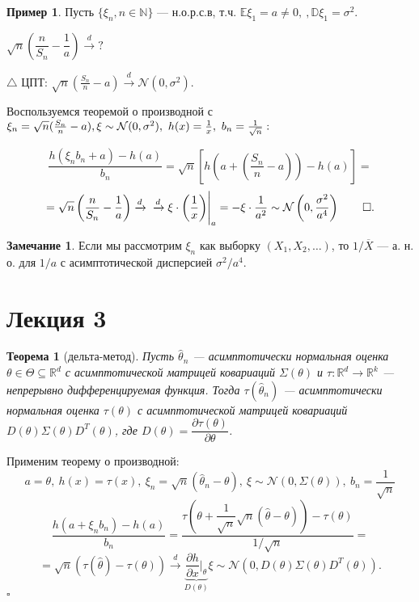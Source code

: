 \documentclass[12pt]{report}
\renewenvironment{proof}{{\bfseries Доказательство:}}{$\square$\\\\}
\newtheorem{theorem}{Теорема}
\theoremstyle{definition}
\newtheorem{example}{Пример}
\newtheorem{remark}{Замечание}
\begin{document}
\begin{example}
	Пусть $\{\xi_n, n \in \mathbb{N} \}$ — н.о.р.с.в, т.ч. $\mathbb{E}\xi_1 = a \neq 0, \ , \mathbb{D}\xi_1 = \sigma^2.$  

$\sqrt{n} \left( \dfrac{n}{S_n} - \dfrac{1}{a} \right) \xrightarrow{d} ?$ 

$\triangle$ ЦПТ: $\sqrt{n}(\frac{S_n}{n} - a) \xrightarrow{d} \mathcal{N}(0, \sigma^2)$.  

Воспользуемся теоремой о производной с $\xi_n = \sqrt{n}(\frac{S_n}{n} - a), \\  \xi \sim \mathcal{N}(0, \sigma^2), \ h(x) = \frac{1}{x}, \ b_n = \frac{1}{\sqrt{n}}:$

$$\dfrac{h(\xi_n b_n+a) - h(a)}{b_n} = \sqrt{n}\left[h\left(a + \left(\dfrac{S_n}{n} - a\right)\right) - h(a)\right] =$$ $$=\sqrt{n} \left( \dfrac{n}{S_n} - \dfrac{1}{a} \right) \xrightarrow{d} \\ \xrightarrow{d} \xi \cdot \left(\dfrac{1}{x} \right) \Biggr\rvert_a = -\xi \cdot \dfrac{1}{a^2} \sim \mathcal{N}\left(0, \dfrac{\sigma^2}{a^4}\right) \qquad \square .$$

\end{example}
\begin{remark}
	Если мы рассмотрим $\xi_n$ как выборку $(X_1, X_2, \dots)$, то $1/\overline{X}$ — а. н. о. для $1/a$ с асимптотической дисперсией $\sigma^2 / a^4$.
\end{remark}

\section{Лекция 3}

\begin{theorem}[дельта-метод]
	Пусть $\hat{\theta}_n$ — асимптотически нормальная оценка $\theta \in \Theta \subseteq \mathbb{R}^d$ с асимптотической матрицей ковариаций $\Sigma(\theta)$ и $\tau:\mathbb{R}^d \rightarrow \mathbb{R}^k$ — непрерывно дифференцируемая функция. Тогда $\tau(\hat{\theta}_n)$ — асимптотически нормальная оценка $\tau(\theta)$ с асимптотической матрицей ковариаций $D(\theta)\Sigma(\theta)D^T(\theta)$, где $D(\theta) = \dfrac{\partial \tau(\theta)}{\partial \theta}$.
\end{theorem}
\begin{proof}
	Применим теорему о производной:
	$$a=\theta, \: h(x) = \tau(x), \: \xi_n=\sqrt{n}(\hat{\theta}_n - \theta), \: \xi \sim \mathcal{N}(0, \Sigma(\theta)),\: b_n=\dfrac{1}{\sqrt{n}}$$
	$$\dfrac{h(a+\xi_nb_n) - h(a)}{b_n} = \dfrac{\tau\left(\theta + \dfrac{1}{\sqrt{n}}\sqrt{n}(\hat{\theta}-\theta)\right) - \tau(\theta)}{1/\sqrt{n}}=$$
	$$=\sqrt{n}(\tau(\hat{\theta}) - \tau(\theta)) \xrightarrow{d} \underbrace{\dfrac{\partial h}{\partial x}\Biggr\rvert_\theta}_{D(\theta)} \xi \sim \mathcal{N}(0, D(\theta)\Sigma(\theta)D^T(\theta)).$$
\end{proof}
\end{document}
